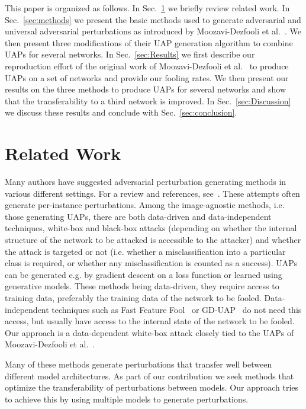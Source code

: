 \documentclass[runningheads]{llncs}
\begin{document}
This paper is organized as follows. In Sec.~\ref{sec:relatedWork} we briefly review related work. In Sec.~\ref{sec:methods} we present the basic methods used to generate adversarial and universal adversarial perturbations as introduced by Moozavi-Dezfooli et al.~\cite{moosavidezfooli_universal_2017}. We then present three modifications of their UAP generation algorithm to combine UAPs for several networks. In Sec.~\ref{sec:Results} we first describe our reproduction effort of the original work of Moozavi-Dezfooli et al.~\cite{moosavidezfooli_universal_2017} to produce UAPs on a set of networks and provide our fooling rates. We then present our results on the three methods to produce UAPs for several networks and show that the transferability to a third network is improved. In Sec.~\ref{sec:Discussion} we discuss these results and conclude with Sec.~\ref{sec:conclusion}.

\section{Related Work}\label{sec:relatedWork}
Many authors have suggested adversarial perturbation generating methods in various different settings. For a review and references, see~\cite{Chaubey2020UniversalAP}. These attempts often generate per-instance perturbations. Among the image-agnostic methods, i.e. those generating UAPs, there are both data-driven and data-independent techniques, white-box and black-box attacks (depending on whether the internal structure of the network to be attacked is accessible to the attacker) and whether the attack is targeted or not (i.e. whether a misclassification into a particular class is required, or whether any misclassification is counted as a success). UAPs can be generated e.g. by gradient descent on a loss function or learned using generative models. These methods being data-driven, they require access to training data, preferably the training data of the network to be fooled. Data-independent techniques such as Fast Feature Fool~\cite{Mopuri2017FastFF} or GD-UAP~\cite{DBLP:journals/corr/abs-1801-08092} do not need this access, but usually have access to the internal state of the network to be fooled. Our approach is a data-dependent white-box attack closely tied to the UAPs of Moozavi-Dezfooli et al.~\cite{moosavidezfooli_universal_2017}.

Many of these methods generate perturbations that transfer well between different model architectures. As part of our contribution we seek methods that optimize the transferability of perturbations between models. Our approach tries to achieve this by using multiple models to generate perturbations.
\end{document}
